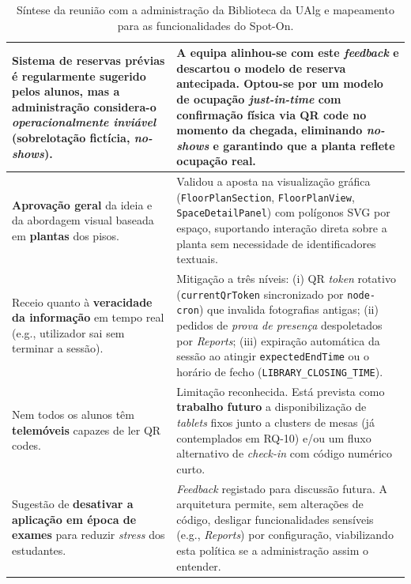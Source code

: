 \documentclass[11pt,a4paper]{article}
\begin{document}
\begin{table}[h!]
\begin{tabularx}{\linewidth}{@{}>{\raggedright\arraybackslash}p{5.2cm}X@{}}
        \midrule
        \textbf{Sistema de reservas} prévias é regularmente sugerido pelos alunos, mas a administração considera-o \emph{operacionalmente inviável} (sobrelotação fictícia, \emph{no-shows}). & A equipa alinhou-se com este \emph{feedback} e descartou o modelo de reserva antecipada. Optou-se por um modelo de \textbf{ocupação \emph{just-in-time}} com confirmação física via QR code no momento da chegada, eliminando \emph{no-shows} e garantindo que a planta reflete ocupação real.                                                                       \\
        \midrule
        \textbf{Aprovação geral} da ideia e da abordagem visual baseada em \textbf{plantas} dos pisos.                                                            & Validou a aposta na visualização gráfica (\texttt{FloorPlanSection}, \texttt{FloorPlanView}, \texttt{SpaceDetailPanel}) com polígonos SVG por espaço, suportando interação direta sobre a planta sem necessidade de identificadores textuais.                                                                                                                          \\
        \midrule
        Receio quanto à \textbf{veracidade da informação} em tempo real (e.g., utilizador sai sem terminar a sessão).                                             & Mitigação a três níveis: (i) QR \emph{token} rotativo (\texttt{currentQrToken} sincronizado por \texttt{node-cron}) que invalida fotografias antigas; (ii) pedidos de \emph{prova de presença} despoletados por \emph{Reports}; (iii) expiração automática da sessão ao atingir \texttt{expectedEndTime} ou o horário de fecho (\texttt{LIBRARY\_CLOSING\_TIME}). \\
        \midrule
        Nem todos os alunos têm \textbf{telemóveis} capazes de ler QR codes.                                                                                      & Limitação reconhecida. Está prevista como \textbf{trabalho futuro} a disponibilização de \emph{tablets} fixos junto a clusters de mesas (já contemplados em RQ-10) e/ou um fluxo alternativo de \emph{check-in} com código numérico curto.                                                                                                                            \\
        \midrule
        Sugestão de \textbf{desativar a aplicação em época de exames} para reduzir \emph{stress} dos estudantes.                                                  & \emph{Feedback} registado para discussão futura. A arquitetura permite, sem alterações de código, desligar funcionalidades sensíveis (e.g., \emph{Reports}) por configuração, viabilizando esta política se a administração assim o entender.                                                                                                                         \\
        \bottomrule
    \end{tabularx}
    \caption{Síntese da reunião com a administração da Biblioteca da UAlg e
        mapeamento para as funcionalidades do Spot-On.}
\end{table}
\end{document}
